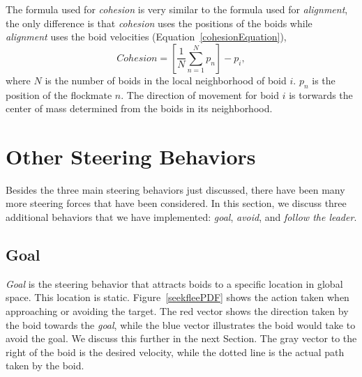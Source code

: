 The formula used for \textit{cohesion} is very similar to the formula used for \textit{alignment}, the only difference is that \textit{cohesion} uses the positions of the boids while \textit{alignment} uses the boid velocities (Equation~\ref{cohesionEquation}), 
\begin{equation}
\label{cohesionEquation}
Cohesion = \left[  \frac{1}{N} \sum_{n=1}^{N} p_n \right ] - p_i, 
\end{equation}
where $N$ is the number of boids in the local neighborhood of boid $i$. $p_n$ is the position of the flockmate $n$.   The direction of movement for boid $i$ is torwards the center of mass determined from the boids in its neighborhood. 
\section{Other Steering Behaviors}\label{otherbehaviors}
Besides the three main steering behaviors just discussed, there have been many more   steering forces that have been considered.  In this section, we discuss three additional behaviors that we have implemented:  \textit{goal}, \textit{avoid}, and \textit{follow the leader}.

\subsection{Goal}
\textit{Goal} is the steering behavior that attracts boids to a specific location in global space. This location is static. Figure~\ref{seekfleePDF} shows the action taken when approaching or avoiding the target. The red vector shows the direction taken by the boid towards the \textit{goal}, while the blue vector illustrates the boid would take to avoid the goal. We discuss this further in the next Section. The gray vector to the right of the boid is the desired velocity, while the dotted line is the actual path taken by the boid.

